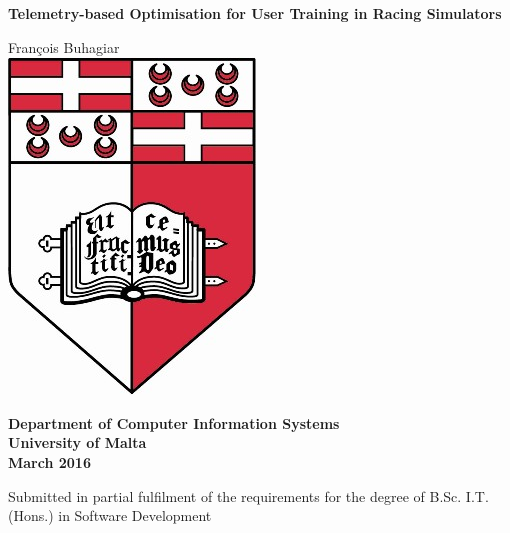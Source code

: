 \documentclass{report}
\begin{document}
\begin{titlepage}
	\begin{center}
		\begin{spacing}{1.5}
			\huge{\textbf{Telemetry-based Optimisation for User Training in Racing Simulators}}
		\end{spacing}
		
		\LARGE{Fran\c{c}ois Buhagiar}
		\vspace{5mm}\\
		\includegraphics[scale=4]{images/UOM_Logo}
		
		\begin{spacing}{1.5}
			\huge{\textbf{Department of Computer Information Systems\\
			\vspace{5mm}
				University of Malta\\
				March 2016 }}
		\end{spacing}
	
		\Large \vfill Submitted in partial fulfilment of the requirements for the degree of B.Sc. I.T. (Hons.) in Software Development
		\clearpage
	\end{center}
\end{titlepage}


\newpage
{} 
\setcounter{page}{1}
\end{document}
